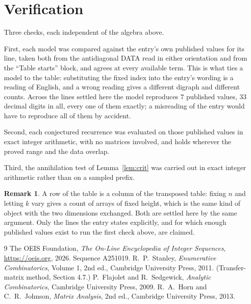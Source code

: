 \documentclass[11pt,a4paper]{article}
\theoremstyle{plain}
\theoremstyle{definition}
\newtheorem{remark}[theorem]{Remark}
\begin{document}
\section{Verification}

Three checks, each independent of the algebra above.

First, each model was compared against the entry's own published values for its line, taken
both from the antidiagonal DATA read in either orientation and from the ``Table starts''
block, and agrees at every available term. This is what ties a model to the table:
substituting the fixed index into the entry's wording is a reading of English, and a wrong
reading gives a different digraph and different counts. Across the lines settled here the
model reproduces $7$ published values, $33$ decimal digits in all, every one of
them exactly; a misreading of the entry would have to reproduce all of them by accident.

Second, each conjectured recurrence was evaluated on those published values in exact
integer arithmetic, with no matrices involved, and holds wherever the proved range and the
data overlap.

Third, the annihilation test of Lemma~\ref{lem:crit} was carried out in exact integer
arithmetic rather than on a sampled prefix.

\begin{remark}
A row of the table is a column of the transposed table: fixing $n$ and letting $k$ vary gives a
count of arrays of fixed height, which is the same kind of object with the two dimensions
exchanged. Both are settled here by the same argument. Only the lines the entry states
explicitly, and for which enough published values exist to run the first check above, are
claimed.
\end{remark}

\begin{thebibliography}{9}
 The OEIS Foundation, \emph{The On-Line Encyclopedia of Integer
Sequences}, \url{https://oeis.org}, 2026. Sequence A251019.
 R.~P.~Stanley, \emph{Enumerative Combinatorics}, Volume 1, 2nd ed.,
Cambridge University Press, 2011. (Transfer-matrix method, Section 4.7.)
 P.~Flajolet and R.~Sedgewick, \emph{Analytic Combinatorics}, Cambridge
University Press, 2009.
 R.~A.~Horn and C.~R.~Johnson, \emph{Matrix Analysis}, 2nd ed., Cambridge
University Press, 2013.
\end{thebibliography}
\end{document}
